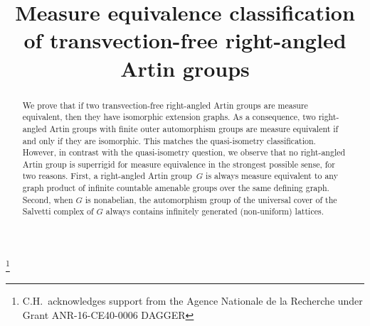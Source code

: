 \documentclass[JEP,XML,SOM,Unicode,NoFloatCountersInSection,published]{cedram}
\theoremstyle{plain}
\theoremstyle{definition}
\begin{document}
\frontmatter
\title{Measure equivalence classification of transvection-free right-angled Artin groups}

\author[\initial{C.} \lastname{Horbez}]{ }
\address{Université Paris-Saclay, CNRS, Laboratoire de mathématiques d'Orsay\\
91405, Orsay, France}

\author[\initial{J.} \lastname{Huang}]{ }
\address{Department of Mathematics, The Ohio State University\\
100 Math Tower, 231 W 18th Ave, Columbus, OH 43210, USA}

\thanks{C.H.\ acknowledges support from the Agence Nationale de la Recherche under Grant ANR-16-CE40-0006 DAGGER}

\begin{abstract}
We prove that if two transvection-free right-angled Artin groups are measure equivalent, then they have isomorphic extension graphs. As a consequence, two right-angled Artin groups with finite outer automorphism groups are measure equivalent if and only if they are isomorphic. This matches the quasi-isometry classification.
However, in contrast with the quasi-isometry question, we observe that no right-angled Artin group is superrigid for measure equivalence in the strongest possible sense, for two reasons. First, a right-angled Artin group~$G$ is always measure equivalent to any graph product of infinite countable amenable groups over the same defining graph. Second, when $G$ is nonabelian, the automorphism group of the universal cover of the Salvetti complex of $G$ always contains infinitely generated (non-uniform) lattices.
\end{abstract}




\end{document}
